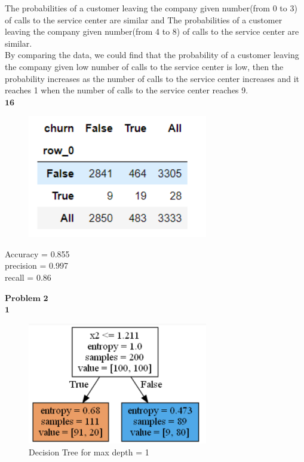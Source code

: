 \documentclass[12pt]{article}
\begin{document}
The probabilities of a customer leaving the company given number(from 0 to 3) of calls to the service center are similar and The probabilities of a customer leaving the company given number(from 4 to 8) of calls to the service center are similar.\\

By comparing the data, we could find that the probability of a customer leaving the company given low number of calls to the service center is low, then the probability increases as the number of calls to the service center increases and it reaches 1 when the number of calls to the service center reaches 9.\\

$\textbf{16}$\\

\begin{figure}[H] 
\centering 
\includegraphics[width=0.7\textwidth]{last} 
\end{figure}

Accuracy = 0.855\\

precision = 0.997\\

recall = 0.86\\

\newpage

$\textbf{Problem 2}$\\

$\textbf{1}$\\

\begin{figure}[H] 
\centering 
\includegraphics[width=0.7\textwidth]{decisiontree1} 
\caption{Decision Tree for max depth = 1}
\end{figure}
\end{document}
